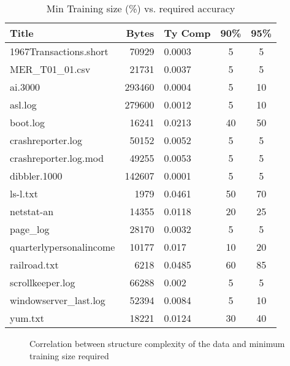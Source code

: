 \begin{table}
\begin{center}
\begin{tabular}{|l|r|l|c|c|} \hline
Title 			& Bytes 	& Ty Comp	& 90\% 		& 95\% \\ \hline \hline
1967Transactions.short	& 70929		& 0.0003	& 5		& 5 			\\ \hline
MER\_T01\_01.csv        & 21731 	& 0.0037	& 5		& 5\\ \hline
ai.3000                 & 293460 	& 0.0004	& 5		& 10\\ \hline
asl.log                 & 279600	& 0.0012	& 5		& 10\\ \hline
boot.log                & 16241		& 0.0213	& 40		& 50\\ \hline
crashreporter.log       & 50152 	& 0.0052	& 5		& 5\\ \hline
crashreporter.log.mod   & 49255		& 0.0053	& 5		& 5\\ \hline
dibbler.1000            & 142607 	& 0.0001	& 5		& 5\\ \hline
ls-l.txt                & 1979		& 0.0461	& 50		& 70\\ \hline
netstat-an              & 14355		& 0.0118	& 20		& 25\\ \hline
page\_log               & 28170		& 0.0032	& 5		& 5\\ \hline
quarterlypersonalincome & 10177		& 0.017		& 10		& 20\\ \hline
railroad.txt            & 6218		& 0.0485	& 60		& 85\\ \hline
scrollkeeper.log        & 66288		& 0.002		& 5		& 5\\ \hline
windowserver\_last.log  & 52394		& 0.0084	& 5		& 10\\ \hline
yum.txt                 & 18221		& 0.0124	& 30		& 40\\ \hline
\end{tabular}
\caption{Min Training size (\%) vs. required accuracy}
\end{center}
\end{table}

\begin{figure}
\begin{center}
\caption{Correlation between structure complexity of 
the data and minimum training size required}
\end{center}
\end{figure}
